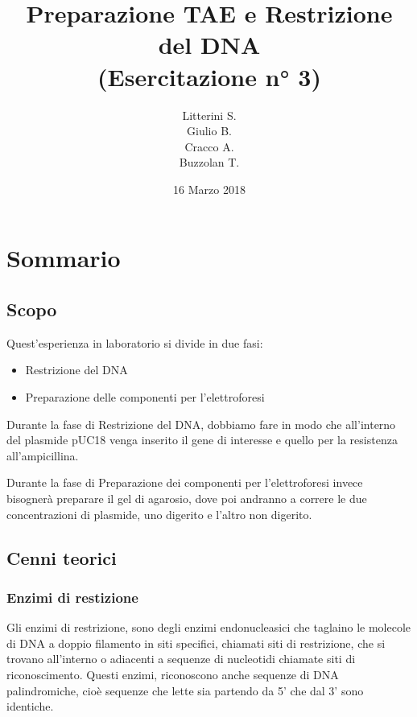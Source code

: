 \documentclass{article}
\begin{document}
\title{Preparazione TAE e Restrizione del DNA \\ (Esercitazione n° 3)} %

\author{Litterini S. \\Giulio B. \\Cracco A.\\Buzzolan T. } %

\date{16 Marzo 2018} %

\maketitle 


\section{Sommario}

\subsection{Scopo}

Quest'esperienza in laboratorio si divide in due fasi:

\begin{itemize}

\item Restrizione del DNA

\item Preparazione delle componenti per l'elettroforesi 

\end{itemize}

Durante la fase di Restrizione del DNA, dobbiamo fare in modo che all'interno del plasmide pUC18 venga inserito il gene di interesse e quello per la resistenza all'ampicillina. 
\vspace{0.3cm}

Durante la fase di Preparazione dei componenti per l'elettroforesi invece bisognerà preparare il gel di agarosio, dove poi andranno a correre le due concentrazioni di plasmide, uno digerito e l'altro non digerito.

\subsection{Cenni teorici}

\subsubsection{Enzimi di restizione}
Gli enzimi di restrizione, sono degli enzimi endonucleasici che taglaino le molecole di DNA a doppio filamento in siti specifici, chiamati siti di restrizione, che si trovano all'interno o adiacenti a sequenze di nucleotidi chiamate siti di riconoscimento.
Questi enzimi, riconoscono anche sequenze di DNA palindromiche, cioè sequenze che lette sia partendo da 5' che dal 3' sono identiche.
\end{document}
